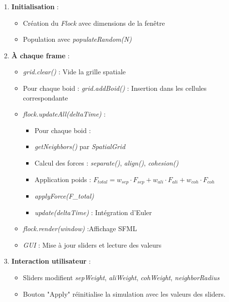 \documentclass[11pt,a4paper]{article}
\begin{document}
\begin{enumerate}
    \item \textbf{Initialisation} :
    \begin{itemize}
        \item Création du \textit{Flock} avec dimensions de la fenêtre
        \item Population avec \textit{populateRandom(N)}
    \end{itemize}
    \item \textbf{À chaque frame} :
    \begin{itemize}
        \item \textit{grid.clear()} : Vide la grille spatiale
        \item Pour chaque boid : \textit{grid.addBoid()} : Insertion dans les cellules correspondante
        \item \textit{flock.updateAll(deltaTime)} :
            \begin{itemize}
                \item Pour chaque boid :
                \item [-] \textit{getNeighbors()} par \textit{SpatialGrid}
                \item [-] Calcul des forces : \textit{separate()}, \textit{align()}, \textit{cohesion()}
                \item [-] Application poids : $F_{total} = w_{sep} \cdot F_{sep} + w_{ali} \cdot F_{ali} + w_{coh} \cdot F_{coh} $
                \item [-] \textit{applyForce(F\_total)}
                \item [-] \textit{update(deltaTime)} : Intégration d'Euler
            \end{itemize}
        \item \textit{flock.render(window)} :Affichage SFML
        \item \textit{GUI} : Mise à jour sliders et lecture des valeurs
    \end{itemize}
    \item \textbf{Interaction utilisateur} :
    \begin{itemize}
        \item Sliders modifient \textit{sepWeight}, \textit{aliWeight}, \textit{cohWeight}, \textit{neighborRadius}
        \item Bouton "Apply" réinitialise la simulation avec les valeurs des sliders.
    \end{itemize}
\end{enumerate}
\end{document}
